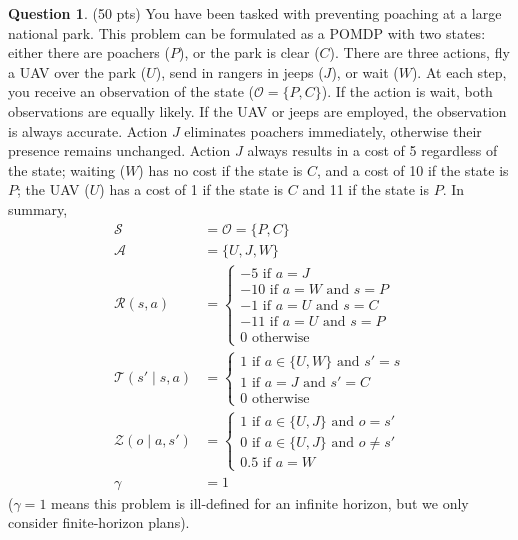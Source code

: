 \documentclass{article}
\theoremstyle{definition}
\newtheorem{question}[thm]{Question}
\begin{document}
\begin{question} (50 pts)
    You have been tasked with preventing poaching at a large national park. This problem can be formulated as a POMDP with two states: either there are poachers ($P$), or the park is clear ($C$). There are three actions, fly a UAV over the park ($U$), send in rangers in jeeps ($J$), or wait ($W$). At each step, you receive an observation of the state ($\mathcal{O} = \{P, C\}$). If the action is wait, both observations are equally likely. If the UAV or jeeps are employed, the observation is always accurate. Action $J$ eliminates poachers immediately, otherwise their presence remains unchanged. Action $J$ always results in a cost of 5 regardless of the state; waiting ($W$) has no cost if the state is $C$, and a cost of 10 if the state is $P$; the UAV ($U$) has a cost of 1 if the state is $C$ and 11 if the state is $P$.
    In summary,
    \begin{align}
        \mathcal{S} &= \mathcal{O} = \{P, C\} \quad \\
        \mathcal{A} &= \{U, J, W\} \\
        \mathcal{R}(s, a) &= \begin{cases}
            -5 \text{ if } a = J \\
            -10 \text{ if } a = W \text{ and } s = P \\
            -1 \text{ if } a = U \text{ and } s = C \\
            -11 \text{ if } a = U \text{ and } s = P \\
            0 \text{ otherwise}
        \end{cases}\\
        \mathcal{T}(s' \mid s, a) &= \begin{cases}
            1 \text{ if } a \in \{U, W\} \text{ and } s' = s\\
            1 \text{ if } a = J \text{ and } s' = C\\
            0 \text{ otherwise}
        \end{cases}\\
        \mathcal{Z}(o \mid a, s') &= \begin{cases}
            1 \text{ if } a \in \{U, J\} \text{ and } o = s' \\
            0 \text{ if } a \in \{U, J\} \text{ and } o \neq s' \\
            0.5 \text{ if } a = W
        \end{cases} \\
        \gamma &= 1
    \end{align}
    ($\gamma=1$ means this problem is ill-defined for an infinite horizon, but we only consider finite-horizon plans).
  

\end{question}
\end{document}
